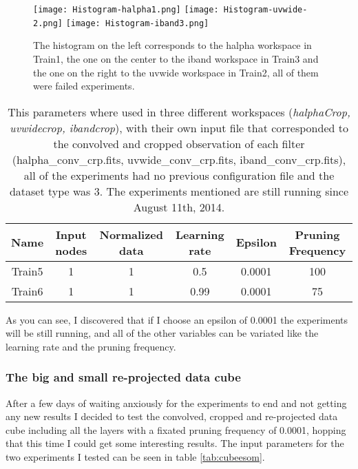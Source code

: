 \documentclass[11pt,fleqn]{book} %
\begin{document}
\begin{figure}[h!]
	\centering
    \texttt{[image: Histogram-halpha1.png]}
    \texttt{[image: Histogram-uvwide-2.png]}
    \texttt{[image: Histogram-iband3.png]}
    \caption{The histogram on the left corresponds to the halpha workspace in Train1, the one on the center to the iband workspace in Train3 and the one on the right to the uvwide workspace in Train2, all of them were failed experiments.}
    \label{img:fail3}
\end{figure}

\begin{table}[h!]
  \centering
    \begin{tabular}{ c c c c c c }
    \hline\hline
    
    Name & Input nodes & Normalized data & Learning rate & Epsilon & Pruning Frequency\\
    \hline
    
    Train5 & 1 & 1 & 0.5 & 0.0001 & 100\\
    Train6 & 1 & 1 & 0.99 & 0.0001 & 75\\

    \hline
  \end{tabular}
  \caption{This parameters where used in three different workspaces (\emph{halphaCrop, uvwidecrop, ibandcrop}), with their own input file that corresponded to the convolved and cropped observation of each filter (halpha\_conv\_crp.fits, uvwide\_conv\_crp.fits, iband\_conv\_crp.fits), all of the experiments had no previous configuration file and the dataset type was 3. The experiments mentioned are still running since August 11th, 2014.}
  \label{tab:threerun}
\end{table}

As you can see, I discovered that if I choose an epsilon of 0.0001 the experiments will be still running, and all of the other variables can be variated like the learning rate and the pruning frequency.

\subsubsection{The big and small re-projected data cube}
After a few days of waiting anxiously for the experiments to end and not getting any new results I decided to test the convolved, cropped and re-projected data cube including all the layers with a fixated pruning frequency of 0.0001, hopping that this time I could get some interesting results. The input parameters for the two experiments I tested can be seen in table \ref{tab:cubeesom}.
\end{document}
